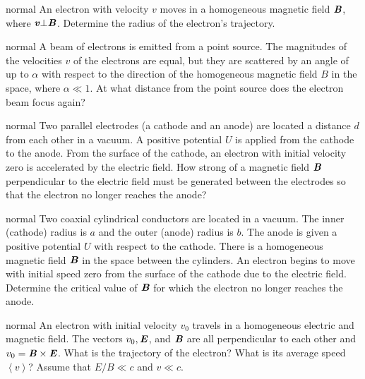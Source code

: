 \hypertarget{P162}{}
\begin{solution}{normal} %
An electron with velocity $v$ moves in a homogeneous magnetic field $\textbf{\textit{B}}$, where $\textbf{\textit{v}}\bot \textbf{\textit{B}}$. Determine the radius of the electron's trajectory.
\end{solution}

\hypertarget{P163}{}
\begin{solution}{normal} %
A beam of electrons is emitted from a point source. The magnitudes of the velocities $v$ of the electrons are equal, but they are scattered by an angle of up to $\alpha$ with respect to the direction of the homogeneous magnetic field $B$ in the space, where $\alpha\ll 1$. At what distance from the point source does the electron beam focus again?
\end{solution}

\hypertarget{P164}{}
\begin{solution}{normal} %
Two parallel electrodes (a cathode and an anode) are located a distance $d$ from each other in a vacuum. A positive potential $U$ is applied from the cathode to the anode. From the surface of the cathode, an electron with initial velocity zero is accelerated by the electric field. How strong of a magnetic field $\textbf{\textit{B}}$ perpendicular to the electric field must be generated between the electrodes so that the electron no longer reaches the anode?
\end{solution}

\hypertarget{P165}{}
\begin{solution}{normal} %
Two coaxial cylindrical conductors are located in a vacuum. The inner (cathode) radius is $a$ and the outer (anode) radius is $b$. The anode is given a positive potential $U$ with respect to the cathode. There is a homogeneous magnetic field $\textbf{\textit{B}}$ in the space between the cylinders. An electron begins to move with initial speed zero from the surface of the cathode due to the electric field. Determine the critical value of $\textbf{\textit{B}}$ for which the electron no longer reaches the anode.
\end{solution}

\hypertarget{P166}{}
\begin{solution}{normal} %
An electron with initial velocity $v_0$ travels in a homogeneous electric and magnetic field. The vectors $v_0,\textbf{\textit{E}}$, and $\textbf{\textit{B}}$ are all perpendicular to each other and $v_0=\textbf{\textit{B}}\times\textbf{\textit{E}}$. What is the trajectory of the electron? What is its average speed $\left<v\right>$? Assume that $E/B\ll c$ and $v\ll c$.
\end{solution}

